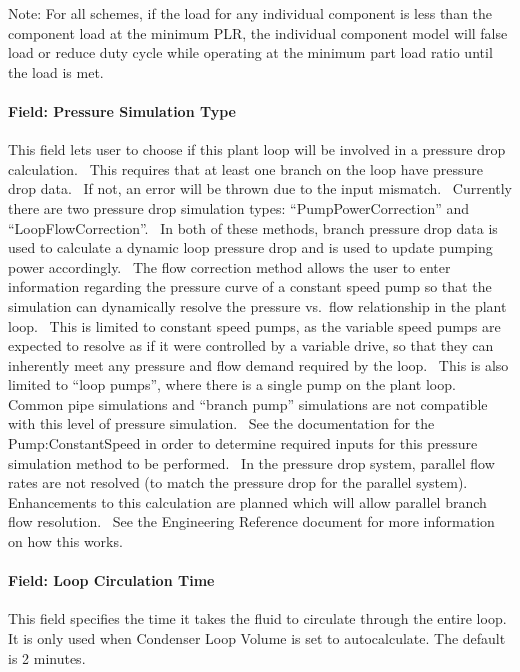 Note: For all schemes, if the load for any individual component is less than the component load at the minimum PLR, the individual component model will false load or reduce duty cycle while operating at the minimum part load ratio until the load is met.

\paragraph{Field: Pressure Simulation Type}\label{field-pressure-simulation-type-1}

This field lets user to choose if this plant loop will be involved in a pressure drop calculation.~ This requires that at least one branch on the loop have pressure drop data.~ If not, an error will be thrown due to the input mismatch.~ Currently there are two pressure drop simulation types: ``PumpPowerCorrection'' and ``LoopFlowCorrection''.~ In both of these methods, branch pressure drop data is used to calculate a dynamic loop pressure drop and is used to update pumping power accordingly.~ The flow correction method allows the user to enter information regarding the pressure curve of a constant speed pump so that the simulation can dynamically resolve the pressure vs.~flow relationship in the plant loop.~ This is limited to constant speed pumps, as the variable speed pumps are expected to resolve as if it were controlled by a variable drive, so that they can inherently meet any pressure and flow demand required by the loop.~ This is also limited to ``loop pumps'', where there is a single pump on the plant loop.~ Common pipe simulations and ``branch pump'' simulations are not compatible with this level of pressure simulation.~ See the documentation for the Pump:ConstantSpeed in order to determine required inputs for this pressure simulation method to be performed.~ In the pressure drop system, parallel flow rates are not resolved (to match the pressure drop for the parallel system).~ Enhancements to this calculation are planned which will allow parallel branch flow resolution.~ See the Engineering Reference document for more information on how this works.

\paragraph{Field: Loop Circulation Time}\label{field-pressure-simulation-type}

This field specifies the time it takes the fluid to circulate through the entire loop. It is only used when Condenser Loop Volume is set to autocalculate. The default is 2 minutes.

